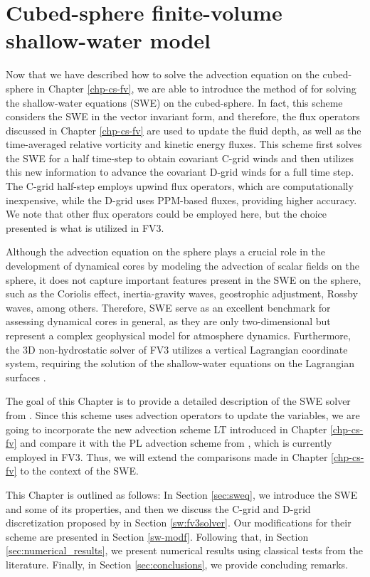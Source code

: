 \chapter{Cubed-sphere finite-volume shallow-water model}
\label{chp-cs-swm}

Now that we have described how to solve the advection equation on the cubed-sphere in Chapter \ref{chp-cs-fv},
we are able to introduce the method of \citet{lin:1997} for solving the shallow-water equations (SWE) on the cubed-sphere.
In fact, this scheme considers the SWE in the vector invariant form, and therefore, 
the flux operators discussed in Chapter \ref{chp-cs-fv} are used to update the fluid depth,
as well as the time-averaged relative vorticity and kinetic energy fluxes.
This scheme first solves the SWE for a half time-step to obtain covariant C-grid winds and 
then utilizes this new information to advance the covariant D-grid winds for a full time step.
The C-grid half-step employs upwind flux operators, which are computationally inexpensive, 
while the D-grid uses PPM-based fluxes, providing higher accuracy. 
We note that other flux operators could be employed here, but the choice presented is what is utilized in FV3.

Although the advection equation on the sphere plays a crucial role in the development of dynamical cores by modeling the advection of scalar fields on the sphere, 
it does not capture important features present in the SWE on the sphere, 
such as the Coriolis effect, inertia-gravity waves, geostrophic adjustment, Rossby waves, among others. 
Therefore, SWE serve as an excellent benchmark for assessing dynamical cores in general,
as they are only two-dimensional but represent a complex geophysical model for atmosphere dynamics.
Furthermore, the 3D non-hydrostatic solver of FV3 utilizes a vertical Lagrangian coordinate system,
requiring the solution of the shallow-water equations on the Lagrangian surfaces \citep{lin:2004, harris:2021}.

The goal of this Chapter is to provide a detailed description of the SWE solver from \citet{lin:1997}.
Since this scheme uses advection operators to update the variables, 
we are going to incorporate the new advection scheme LT introduced in Chapter \ref{chp-cs-fv} and compare it with the PL advection scheme from \citet{putman:2007},
which is currently employed in FV3. 
Thus, we will extend the comparisons made in Chapter \ref{chp-cs-fv} to the context of the SWE.

This Chapter is outlined as follows:
In Section \ref{sec:sweq}, we introduce the SWE and some of its properties, and then we discuss
the C-grid and D-grid discretization proposed by \citet{lin:1997} in Section \ref{sw:fv3solver}.
Our modifications for their scheme are presented in Section \ref{sw-modf}.
Following that, in Section \ref{sec:numerical_results}, 
we present numerical results using classical tests from the literature. 
Finally, in Section \ref{sec:conclusions}, we provide concluding remarks.

